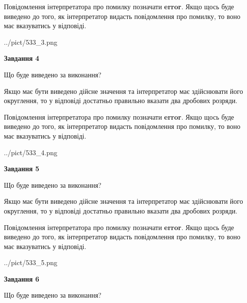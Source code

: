 \documentclass[12pt, ukrainian]{article}
\begin{document}
{\begin {Large}
Повідомлення інтерпретатора про помилку позначати \textbf{error}.
Якщо щось буде виведено до того, як інтерпретатор видасть повідомлення про помилку, 
то воно має вказуватись у відповіді. \par

\begin{center}
	{../pict/533_3.png}
\end{center}
\newpage

{\begin {center}\textbf{Завдання 4}\end {center}}\par
Що буде виведено за виконання? \par

Якщо має бути виведено дійсне значення та інтерпретатор має здійснювати його округлення, 
то у відповіді достатньо правильно вказати два дробових розряди.

Повідомлення інтерпретатора про помилку позначати \textbf{error}.
Якщо щось буде виведено до того, як інтерпретатор видасть повідомлення про помилку, 
то воно має вказуватись у відповіді. \par

\begin{center}
	{../pict/533_4.png}
\end{center}
\newpage

{\begin {center}\textbf{Завдання 5}\end {center}}\par
Що буде виведено за виконання? \par

Якщо має бути виведено дійсне значення та інтерпретатор має здійснювати його округлення, 
то у відповіді достатньо правильно вказати два дробових розряди.

Повідомлення інтерпретатора про помилку позначати \textbf{error}.
Якщо щось буде виведено до того, як інтерпретатор видасть повідомлення про помилку, 
то воно має вказуватись у відповіді. \par

\begin{center}
	{../pict/533_5.png}
\end{center}
\newpage

{\begin {center}\textbf{Завдання 6}\end {center}}\par
Що буде виведено за виконання? \par


\end{Large}}
\end{document}
